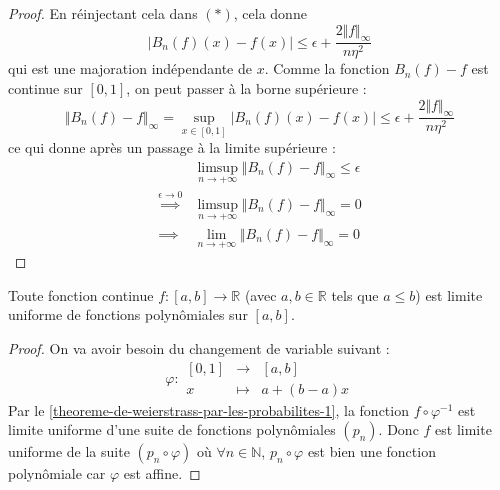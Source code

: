 \begin{proof}
    En réinjectant cela dans $(*)$, cela donne
    \[ |B_n(f)(x) - f(x)| \leq \epsilon + \frac{2 \Vert f \Vert_\infty}{n \eta^2} \]
    qui est une majoration indépendante de $x$. Comme la fonction $B_n(f) - f$ est continue sur $[0, 1]$, on peut passer à la borne supérieure :
    \[ \Vert B_n(f) - f \Vert_\infty = \sup_{x \in [0, 1]} |B_n(f)(x) - f(x)| \leq \epsilon + \frac{2 \Vert f \Vert_\infty}{n \eta^2} \]
    ce qui donne après un passage à la limite supérieure :
    \begin{align*}
      &\limsup_{n \rightarrow +\infty} \Vert B_n(f) - f \Vert_\infty \leq \epsilon \\
      \overset{\epsilon \longrightarrow 0}{\implies} &\limsup_{n \rightarrow +\infty} \Vert B_n(f) - f \Vert_\infty = 0 \\
      \implies &\lim_{n \rightarrow +\infty} \Vert B_n(f) - f \Vert_\infty = 0
    \end{align*}
  \end{proof}

  \begin{theorem}[Weierstrass]
    Toute fonction continue $f : [a,b] \rightarrow \mathbb{R}$ (avec $a, b \in \mathbb{R}$ tels que $a \leq b$) est limite uniforme de fonctions polynômiales sur $[a, b]$.
  \end{theorem}

  \begin{proof}
    On va avoir besoin du changement de variable suivant :
    \[ \varphi :
    \begin{array}{ccc}
      [0,1] &\rightarrow& [a, b] \\
      x &\mapsto& a + (b-a) x
    \end{array}
    \]
    Par le \cref{theoreme-de-weierstrass-par-les-probabilites-1}, la fonction $f \circ \varphi^{-1}$ est limite uniforme d'une suite de fonctions polynômiales $(p_n)$. Donc $f$ est limite uniforme de la suite $(p_n \circ \varphi)$ où $\forall n \in \mathbb{N}$, $p_n \circ \varphi$ est bien une fonction polynômiale car $\varphi$ est affine.
  \end{proof}

